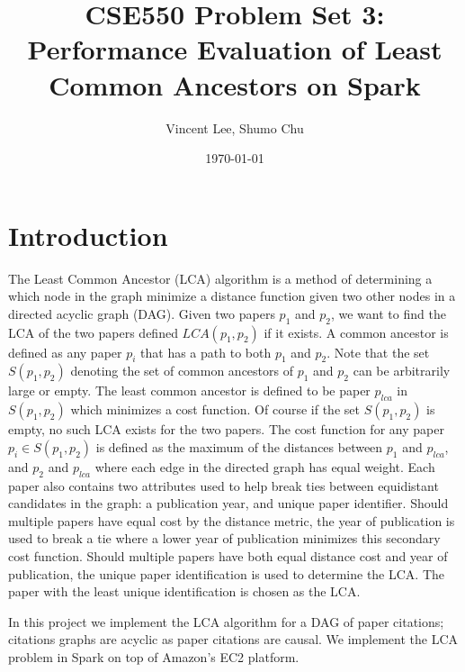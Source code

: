 \documentclass{article}
\begin{document}
\title{CSE550 Problem Set 3: Performance Evaluation of Least Common Ancestors on Spark}
\author{Vincent Lee, Shumo Chu}
\date{\today}

\maketitle

\tableofcontents


\section{Introduction}
\label{sec:intro}
The Least Common Ancestor (LCA) algorithm is a method of determining a which node in the graph minimize a distance function given two other nodes in a directed acyclic graph (DAG).
Given two papers $p_1$ and $p_2$, we want to find the LCA of the two papers defined $LCA(p_1, p_2)$ if it exists.
A common ancestor is defined as any paper $p_i$ that has a path to both $p_1$ and $p_2$.
Note that the set $S(p_1, p_2)$ denoting the set of common ancestors of $p_1$ and $p_2$ can be arbitrarily large or empty.
The least common ancestor is defined to be paper $p_{lca}$ in $S(p_1, p_2)$ which minimizes a cost function.
Of course if the set $S(p_1, p_2)$ is empty, no such LCA exists for the two papers.
The cost function for any paper $p_i \in S(p_1, p_2)$ is defined as the maximum of the distances between $p_1$ and $p_{lca}$, and $p_2$ and $p_{lca}$ where each edge in the directed graph has equal weight.
Each paper also contains two attributes used to help break ties between equidistant candidates in the graph: a publication year, and unique paper identifier.
Should multiple papers have equal cost by the distance metric, the year of publication is used to break a tie where a lower year of publication minimizes this secondary cost function.
Should multiple papers have both equal distance cost and year of publication, the unique paper identification is used to determine the LCA.
The paper with the least unique identification is chosen as the LCA.

In this project we implement the LCA algorithm for a DAG of paper citations; citations graphs are acyclic as paper citations are causal.
We implement the LCA problem in Spark on top of Amazon's EC2 platform.
\end{document}
